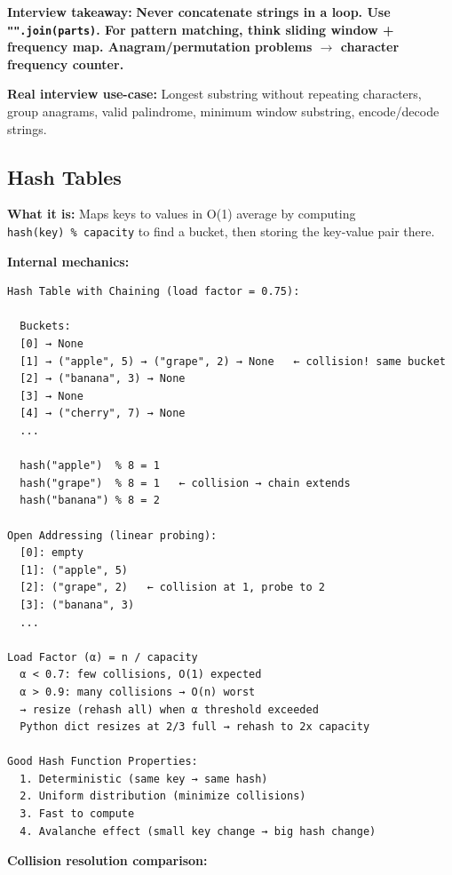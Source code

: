 \documentclass[11pt]{article}
\begin{document}
\textbf{Interview takeaway:} \textbf{Never concatenate strings in a loop. Use \texttt{"".join(parts)}. For pattern matching, think sliding window + frequency map. Anagram/permutation problems \(\rightarrow\) character frequency counter.}

\textbf{Real interview use-case:} Longest substring without repeating characters, group anagrams, valid palindrome, minimum window substring, encode/decode strings.

\subsection{Hash Tables}\label{hash-tables}

\textbf{What it is:} Maps keys to values in O(1) average by computing \texttt{hash(key)\ \%\ capacity} to find a bucket, then storing the key-value pair there.

\textbf{Internal mechanics:}

\setcodelang{}

\begin{verbatim}
Hash Table with Chaining (load factor = 0.75):

  Buckets:
  [0] → None
  [1] → ("apple", 5) → ("grape", 2) → None   ← collision! same bucket
  [2] → ("banana", 3) → None
  [3] → None
  [4] → ("cherry", 7) → None
  ...

  hash("apple")  % 8 = 1
  hash("grape")  % 8 = 1   ← collision → chain extends
  hash("banana") % 8 = 2

Open Addressing (linear probing):
  [0]: empty
  [1]: ("apple", 5)
  [2]: ("grape", 2)   ← collision at 1, probe to 2
  [3]: ("banana", 3)
  ...

Load Factor (α) = n / capacity
  α < 0.7: few collisions, O(1) expected
  α > 0.9: many collisions → O(n) worst
  → resize (rehash all) when α threshold exceeded
  Python dict resizes at 2/3 full → rehash to 2x capacity

Good Hash Function Properties:
  1. Deterministic (same key → same hash)
  2. Uniform distribution (minimize collisions)
  3. Fast to compute
  4. Avalanche effect (small key change → big hash change)
\end{verbatim}

\textbf{Collision resolution comparison:}
\end{document}
